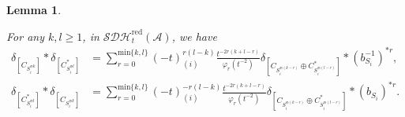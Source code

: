\documentclass[12pt]{amsart}
\newtheorem{lemma}[theorem]{Lemma}
\theoremstyle{definition}
\numberwithin{equation}{section}
\begin{document}
\begin{lemma}
    \label{eikfil}
    
    For any $ k,l \geqslant 1 $, in $ \mathcal{SDH}_t^{\mathrm{red}}(\mathcal{A})$, we have
    \begin{align*}
        \delta_{[C_{S_i^{\oplus k}}]} * \delta_{[C_{S_i^{\oplus l}}^*]} &= \sum_{r=0}^{\mathrm{min}\{k,l\}} (-t)_{(i)}^{r(l-k)} \frac{t^{-2r(k+l-r)}}{\varphi_r(t^{-2})} \delta_{[C_{S_i^{\oplus (k-r)}} \oplus C_{S_i^{\oplus (l-r)}}^*]} * (b_{S_i}^{-1})^{*r},\\
        \delta_{[C_{S_i^{\oplus l}}^*]} * \delta_{[C_{S_i^{\oplus k}}]} &= \sum_{r=0}^{\mathrm{min}\{k,l\}} (-t)_{(i)}^{-r(l-k)} \frac{t^{-2r(k+l-r)}}{\varphi_r(t^{-2})} \delta_{[C_{S_i^{\oplus (k-r)}} \oplus C_{S_i^{\oplus (l-r)}}^*]} * (b_{S_i})^{*r}.
    \end{align*}
    
\end{lemma}
\end{document}
